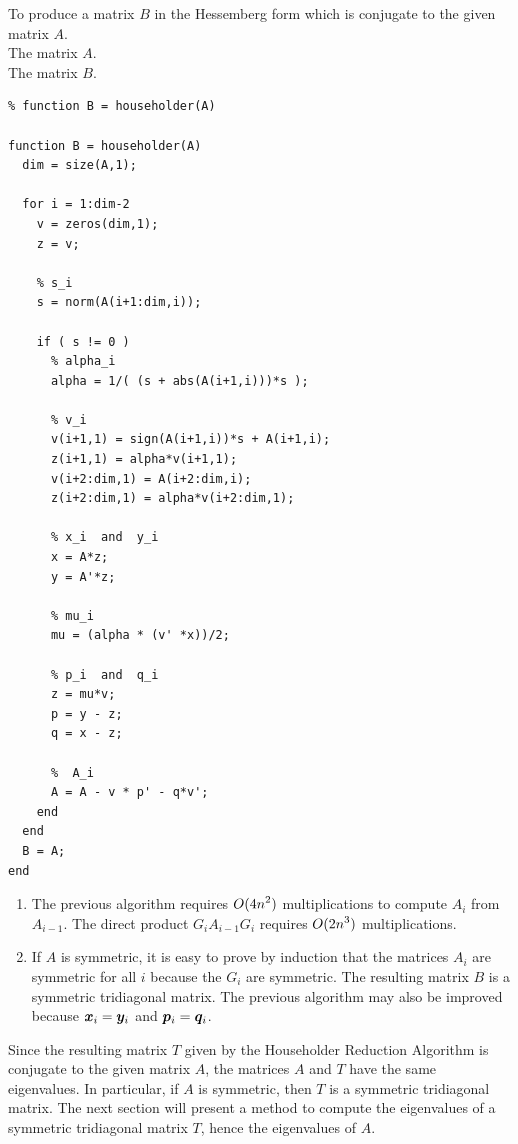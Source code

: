 \begin{code}
To produce a matrix $B$ in the Hessemberg form which is conjugate to the
given matrix $A$.\\
 The matrix $A$.\\
 The matrix $B$.
\small
\begin{verbatim}
% function B = householder(A)

function B = householder(A)
  dim = size(A,1);

  for i = 1:dim-2
    v = zeros(dim,1);
    z = v;

    % s_i
    s = norm(A(i+1:dim,i));

    if ( s != 0 )
      % alpha_i
      alpha = 1/( (s + abs(A(i+1,i)))*s );

      % v_i
      v(i+1,1) = sign(A(i+1,i))*s + A(i+1,i);    
      z(i+1,1) = alpha*v(i+1,1);
      v(i+2:dim,1) = A(i+2:dim,i);
      z(i+2:dim,1) = alpha*v(i+2:dim,1);

      % x_i  and  y_i
      x = A*z;
      y = A'*z;

      % mu_i
      mu = (alpha * (v' *x))/2;

      % p_i  and  q_i
      z = mu*v;
      p = y - z;
      q = x - z;

      %  A_i
      A = A - v * p' - q*v';
    end
  end
  B = A;
end
\end{verbatim}
\end{code}

\begin{rmkList}
\begin{enumerate}
\item The previous algorithm requires $\displaystyle O(4n^2)$
multiplications to compute $A_i$ from $A_{i-1}$.  The direct product
$G_i A_{i-1} G_i$ requires $\displaystyle O(2n^3)$ multiplications.
\item If $A$ is symmetric, it is easy to prove by induction that the matrices
$A_i$ are symmetric for all $i$ because the $G_i$ are symmetric.  The
resulting matrix $B$ is a symmetric tridiagonal matrix.  The previous
algorithm may also be improved because $\bm{x}_i = \bm{y}_i$ and
$\bm{p}_i = \bm{q}_i$.
\end{enumerate}
\end{rmkList}

Since the resulting matrix $T$ given by the Householder Reduction Algorithm
is conjugate to the given matrix $A$, the matrices $A$ and $T$ have the same
eigenvalues.  In particular, if $A$ is symmetric, then $T$ is a symmetric
tridiagonal matrix.  The next section will present a method to compute the
eigenvalues of a symmetric tridiagonal matrix $T$, hence the eigenvalues of
$A$.

